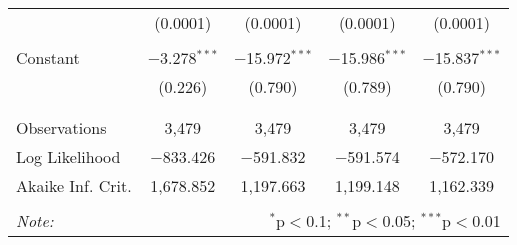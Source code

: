 \begin{table}[!htbp]
\begin{tabular}{@{\extracolsep{-5pt}}lcccc}
  & (0.0001) & (0.0001) & (0.0001) & (0.0001) \\ 
  & & & & \\ 
 Constant & $-$3.278$^{***}$ & $-$15.972$^{***}$ & $-$15.986$^{***}$ & $-$15.837$^{***}$ \\ 
  & (0.226) & (0.790) & (0.789) & (0.790) \\ 
  & & & & \\ 
\hline \\[-1.8ex] 
Observations & 3,479 & 3,479 & 3,479 & 3,479 \\ 
Log Likelihood & $-$833.426 & $-$591.832 & $-$591.574 & $-$572.170 \\ 
Akaike Inf. Crit. & 1,678.852 & 1,197.663 & 1,199.148 & 1,162.339 \\ 
\hline 
\hline \\[-1.8ex] 
\textit{Note:}  & \multicolumn{4}{r}{$^{*}$p$<$0.1; $^{**}$p$<$0.05; $^{***}$p$<$0.01} \\ 
\end{tabular} 
\end{table} 
